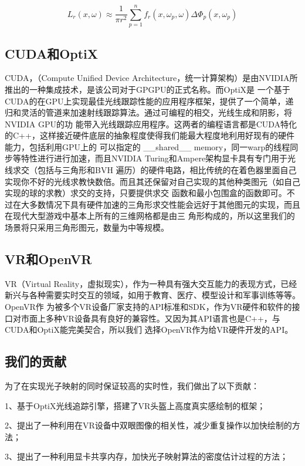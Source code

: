 \documentclass[UTF8]{ctexart}
\begin{document}
        \begin{equation}
        L_r(x,\omega)\approx\frac{1}{\pi r^2}\sum_{p=1}^nf_r(x,\omega_p,\omega)\Delta\Phi_p(x,\omega_p)
        \label{equ:1}
        \end{equation}
    \subsection{CUDA和OptiX}
        CUDA，（Compute Unified Device Architecture，统一计算架构）是由NVIDIA所推出的一种集成技术，是该公司对于GPGPU的正式名称。而OptiX\cite{2010OptiX}是
        一个基于CUDA的在GPU上实现最佳光线跟踪性能的应用程序框架，提供了一个简单，递归和灵活的管道来加速射线跟踪算法。通过可编程的相交，光线生成和阴影，将NVIDIA GPU的功
        能带入光线跟踪应用程序。这两者的编程语言都是CUDA特化的C++，这样接近硬件底层的抽象程度使得我们能最大程度地利用好现有的硬件能力，包括利用GPU上的
        可以指定的 \_\_shared\_\_ memory，同一warp的线程同步等特性进行进行加速，而且NVIDIA Turing和Ampere架构显卡具有专门用于光线求交（包括与三角形和BVH
        遍历）的硬件电路，相比传统的在着色器里面自己实现你不好的光线求教快数倍。而且其还保留对自己实现的其他种类图元（如自己实现的球的求教）求交的支持，只要提供求交
        函数和最小包围盒的函数即可。不过在大多数情况下具有硬件加速的三角形求交性能会远好于其他图元的实现，而且在现代大型游戏中基本上所有的三维网格都是由三
        角形构成的，所以这里我们的场景将只采用三角形图元，数量为中等规模。
    \subsection{VR和OpenVR}
        VR（Virtual Reality，虚拟现实），作为一种具有强大交互能力的表现方式，已经新兴与各种需要实时交互的领域，如用于教育、医疗、模型设计和军事训练等等。OpenVR作
        为被多个VR设备厂家支持的API标准和SDK，作为VR硬件和软件的接口对市面上多种VR设备具有良好的兼容性。又因为其API语言也是C++，与CUDA和OptiX能完美契合，所以我们
        选择OpenVR作为给VR硬件开发的API。
    \subsection{我们的贡献}
        为了在实现光子映射的同时保证较高的实时性，我们做出了以下贡献：

        1、基于OptiX光线追踪引擎，搭建了VR头盔上高度真实感绘制的框架；

        2、提出了一种利用在VR设备中双眼图像的相关性，减少重复操作以加快绘制的方法；

        3、提出了一种利用显卡共享内存，加快光子映射算法的密度估计过程的方法；
\end{document}
